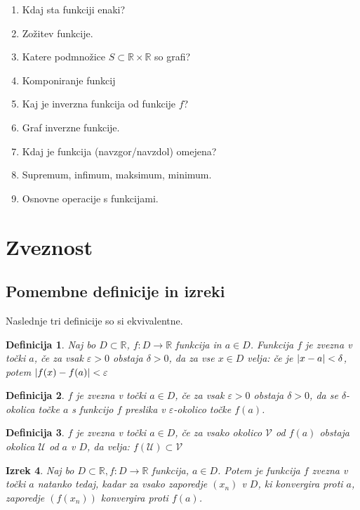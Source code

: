 \documentclass[a4paper,12pt]{report}
\newtheorem{izrek}{Izrek}[section]
\newtheorem{definicija}[izrek]{Definicija}
\begin{document}
\begin{enumerate}
    \item Kdaj sta funkciji enaki?
    \item Zožitev funkcije.
    \item Katere podmnožice $S \subset \mathbb{R} \times \mathbb{R}$ so grafi?
    \item Komponiranje funkcij
    \item Kaj je inverzna funkcija od funkcije $f$?
    \item Graf inverzne funkcije.
    \item Kdaj je funkcija (navzgor/navzdol) omejena?
    \item Supremum, infimum, maksimum, minimum.
    \item Osnovne operacije s funkcijami.
\end{enumerate}

\pagebreak

\section*{Zveznost}


\subsection*{Pomembne definicije in izreki}
Naslednje tri definicije so si ekvivalentne.
\begin{definicija}
    Naj bo $D \subset \mathbb{R}$, $f: D \to \mathbb{R}$ funkcija in $a \in D$. 
    Funkcija $f$ je zvezna v točki $a$, če za vsak $\varepsilon>0$ obstaja $\delta>0$, da 
    za vse $x \in D$ velja: če je $\abs{x-a} < \delta$, potem $\abs{f(x)-f(a)} < \varepsilon$
\end{definicija}

\begin{definicija}
    $f$ je zvezna v točki $a \in D$, če za vsak $\varepsilon > 0$ obstaja $\delta > 0$, 
    da se $\delta$-okolica točke $a$ s funkcijo $f$ preslika v $\varepsilon$-okolico točke $f(a)$.
\end{definicija}

\begin{definicija}
    $f$ je zvezna v točki $a \in D$, če za vsako okolico $\mathcal{V}$ od $f(a)$ obstaja okolica 
    $\mathcal{U}$ od $a$ v $D$, da velja: $f(\mathcal{U}) \subset \mathcal{V}$
\end{definicija}


\begin{izrek}
    Naj bo $D \subset \mathbb{R}, f: D \to \mathbb{R}$ funkcija, $a \in D$. Potem je funkcija $f$ 
    zvezna v točki $a$ natanko tedaj, kadar za vsako zaporedje $(x_n)$ v $D$, ki konvergira proti $a$, 
    zaporedje $(f(x_n))$ konvergira proti $f(a)$.
\end{izrek}
\end{document}
